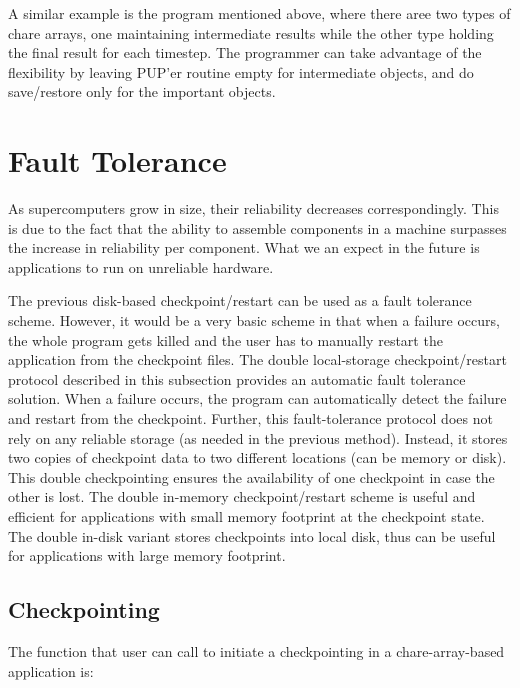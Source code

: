 A similar example is the program mentioned above, where there aree two 
types of chare arrays, one maintaining intermediate results while the 
other type holding the final result for each timestep. The programmer 
can take advantage of the flexibility by leaving PUP'er routine empty
for intermediate objects, and do save/restore only for the important 
objects. 

\section{Fault Tolerance}
\label{sec:MemCheckpointing}
As supercomputers grow in size, their reliability decreases correspondingly. This is due to the fact that the ability to assemble components in a machine surpasses the increase in reliability per component. What we an expect in the future is applications to run on unreliable hardware.

The previous disk-based checkpoint/restart can be used as a fault tolerance scheme. However, it would be a very basic scheme in that when a failure occurs, the whole program gets killed and the user has to
manually restart the application from the checkpoint files.
The double local-storage checkpoint/restart protocol described in this subsection
provides an automatic fault tolerance solution. When a failure occurs,
the program can automatically detect the failure and restart from the 
checkpoint.
Further, this fault-tolerance protocol does not rely on any reliable
storage (as needed in the previous method). 
Instead, it stores two copies of checkpoint data to two different
locations (can be memory or disk).
This double checkpointing ensures the availability of one checkpoint in case
the other is lost. 
The double in-memory checkpoint/restart scheme is useful and efficient
for applications with small memory footprint at the checkpoint state. 
The double in-disk variant stores checkpoints into local disk, thus 
can be useful for applications with large memory footprint. 


\subsection{Checkpointing}

The function that user can call to initiate a checkpointing in a chare-array-based application is: 

